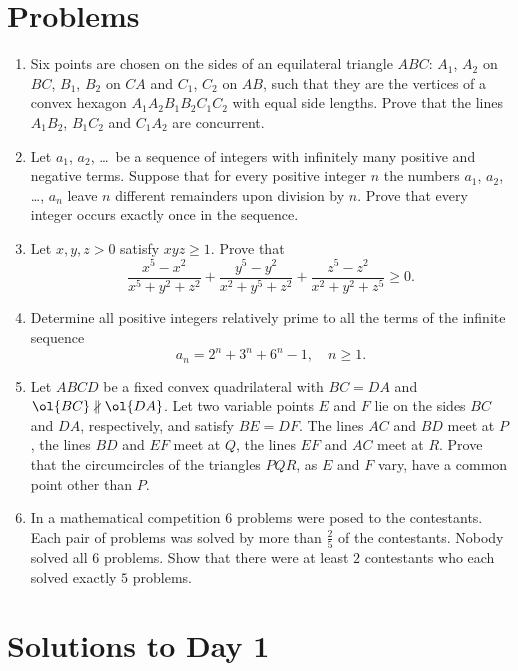 \documentclass[11pt]{scrartcl}
\begin{document}
\section{Problems}
\begin{enumerate}[\bfseries 1.]
\item %
Six points are chosen on the sides of an equilateral triangle $ABC$:
$A_1$, $A_2$ on $BC$, $B_1$, $B_2$ on $CA$ and $C_1$, $C_2$ on $AB$,
such that they are the vertices of a
convex hexagon $A_1A_2B_1B_2C_1C_2$ with equal side lengths.
Prove that the lines $A_1B_2$, $B_1C_2$ and $C_1A_2$ are concurrent.

\item %
Let $a_1$, $a_2$, \dots\ be a sequence of integers
with infinitely many positive and negative terms.
Suppose that for every positive integer $n$
the numbers $a_1$, $a_2$, \dots, $a_n$
leave $n$ different remainders upon division by $n$.
Prove that every integer occurs exactly once in the sequence.

\item %
Let $x,y,z > 0$ satisfy $xyz\geq 1$. Prove that
\[ \frac { x^5-x^2 }{x^5+y^2+z^2}
  + \frac {y^5-y^2}{x^2+y^5+z^2}
  + \frac {z^5-z^2}{x^2+y^2+z^5} \geq 0. \]

\item %
Determine all positive integers relatively
prime to all the terms of the infinite sequence
\[ a_n = 2^n+3^n+6^n-1, \quad n \ge 1. \]

\item %
Let $ABCD$ be a fixed convex quadrilateral
with $BC=DA$ and $\ol{BC} \nparallel \ol{DA}$.
Let two variable points $E$ and $F$ lie on the
sides $BC$ and $DA$, respectively, and satisfy $BE=DF$.
The lines $AC$ and $BD$ meet at $P$,
the lines $BD$ and $EF$ meet at $Q$,
the lines $EF$ and $AC$ meet at $R$.
Prove that the circumcircles of the triangles $PQR$,
as $E$ and $F$ vary, have a common point other than $P$.

\item %
In a mathematical competition $6$ problems were posed to the contestants.
Each pair of problems was solved by more than $\frac{2}{5}$ of the contestants.
Nobody solved all 6 problems.
Show that there were at least $2$ contestants
who each solved exactly $5$ problems.

\end{enumerate}
\pagebreak

\section{Solutions to Day 1}
\end{document}
